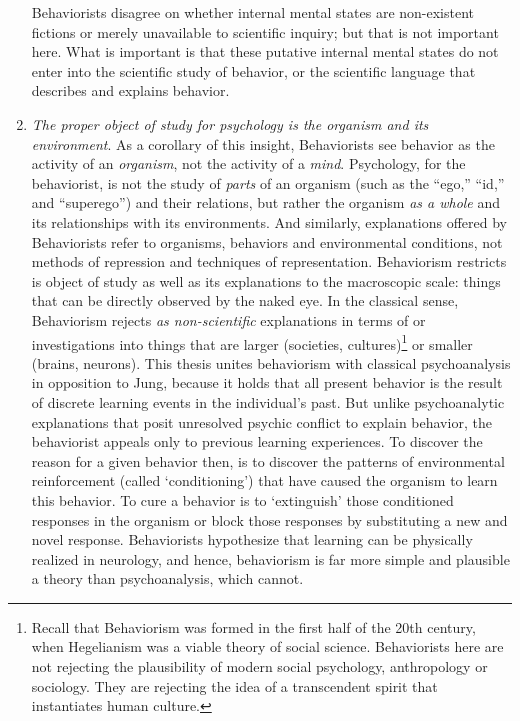 \begin{refsection}
\begin{enumerate}
Behaviorists disagree on whether internal mental states are non-existent fictions or merely unavailable to scientific inquiry; but that is not important here. What is important is that these putative internal mental states do not enter into the scientific study of behavior, or the scientific language that describes and explains behavior.

\item \emph{The proper object of study for psychology is the organism and its environment}. As a corollary of this insight, Behaviorists see behavior as the activity of an \emph{organism}, not the activity of a \emph{mind}. Psychology, for the behaviorist, is not the study of \emph{parts} of an organism (such as the ``ego,'' ``id,'' and ``superego'') and their relations, but rather the organism \emph{as a whole} and its relationships with its environments. And similarly, explanations offered by Behaviorists refer to organisms, behaviors and environmental conditions, not methods of repression and techniques of representation. Behaviorism restricts is object of study as well as its explanations to the macroscopic scale: things that can be directly observed by the naked eye. In the classical sense, Behaviorism rejects \emph{as non-scientific} explanations in terms of or investigations into things that are larger (societies, cultures)\footnote{Recall that Behaviorism was formed in the first half of the 20th century, when Hegelianism was a viable theory of social science. Behaviorists here are not rejecting the plausibility of modern social psychology, anthropology or sociology. They are rejecting the idea of a transcendent spirit that instantiates human culture.} or smaller (brains, neurons).
This thesis unites behaviorism with classical psychoanalysis in opposition to Jung, because it holds that all present behavior is the result of discrete learning events in the individual's past. But unlike psychoanalytic explanations that posit unresolved psychic conflict to explain behavior, the behaviorist appeals only to previous learning experiences. To discover the reason for a given behavior then, is to discover the patterns of environmental reinforcement (called `conditioning') that have caused the organism to learn this behavior. To cure a behavior is to `extinguish' those conditioned responses in the organism or block those responses by substituting a new and novel response. Behaviorists hypothesize that learning can be physically realized in neurology, and hence, behaviorism is far more simple and plausible a theory than psychoanalysis, which cannot.


\end{enumerate}
\end{refsection}
